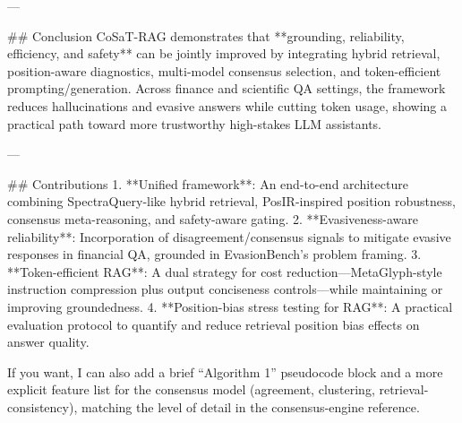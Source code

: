 ---

## Conclusion  
CoSaT-RAG demonstrates that **grounding, reliability, efficiency, and safety** can be jointly improved by integrating hybrid retrieval, position-aware diagnostics, multi-model consensus selection, and token-efficient prompting/generation. Across finance and scientific QA settings, the framework reduces hallucinations and evasive answers while cutting token usage, showing a practical path toward more trustworthy high-stakes LLM assistants.

---

## Contributions  
1. **Unified framework**: An end-to-end architecture combining SpectraQuery-like hybrid retrieval, PosIR-inspired position robustness, consensus meta-reasoning, and safety-aware gating.  
2. **Evasiveness-aware reliability**: Incorporation of disagreement/consensus signals to mitigate evasive responses in financial QA, grounded in EvasionBench’s problem framing.  
3. **Token-efficient RAG**: A dual strategy for cost reduction—MetaGlyph-style instruction compression plus output conciseness controls—while maintaining or improving groundedness.  
4. **Position-bias stress testing for RAG**: A practical evaluation protocol to quantify and reduce retrieval position bias effects on answer quality.  

If you want, I can also add a brief “Algorithm 1” pseudocode block and a more explicit feature list for the consensus model (agreement, clustering, retrieval-consistency), matching the level of detail in the consensus-engine reference.